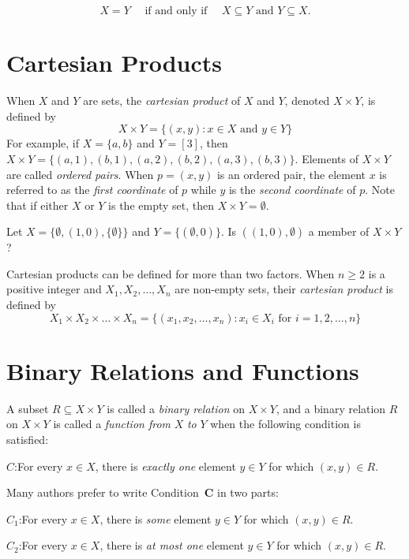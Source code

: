 \[
X = Y \quad\text{ if and only if }\quad X\subseteq Y \text{ and } Y\subseteq X.
\]  

\section{Cartesian Products} \label{s:background:products}

When $X$ and $Y$ are sets, the \textit{cartesian product}
of $X$ and $Y$, denoted $X\times Y$, is defined by
\[
X\times Y=\{(x,y): x\in X \text{ and } y\in Y\}
\]
For example, if $X=\{a,b\}$ and $Y=[3]$, then
$X\times Y=\{(a,1),(b,1),(a,2),(b,2),(a,3),(b,3)\}$.
Elements of $X\times Y$ are called \textit{ordered pairs}.
When $p=(x,y)$ is an ordered pair, the element $x$ is referred
to as the \textit{first coordinate} of $p$ while $y$ is the
\textit{second coordinate} of $p$.
Note that if either $X$ or $Y$ is the empty set, then
$X\times Y=\emptyset$.

\begin{example}
Let $X=\{\emptyset,(1,0),\{\emptyset\}\}$ and $Y=\{(\emptyset,0)\}$.
Is $((1,0),\emptyset)$ a member of $X\times Y$?
\end{example}

Cartesian products can be defined for more than two factors.
When $n\ge 2$ is a positive integer and $X_1,X_2,\dots,X_n$ are
non-empty sets, their \textit{cartesian product} is defined
by
\[
X_1\times X_2\times\dots\times X_n=\{(x_1,x_2,\dots,x_n): x_i\in X_i
\text{ for } i = 1,2,\dots,n\}
\]


\section{Binary Relations and Functions}\label{s:background:relations}

A subset $R\subseteq X\times Y$ is called a \textit{binary
relation} on $X\times Y$, and a binary relation $R$ on $X\times Y$ 
is called a \textit{function from} $X$ \textit{to} $Y$ when the
following condition is satisfied:

\medskip
\noindent
$C$:\quad For every $x\in X$, there is \textit{exactly one}
element $y\in Y$ for which $(x,y)\in R$.

\medskip
Many authors prefer to write Condition~\textbf{C} in two parts:

\medskip
\noindent
$C_1$:\quad For every $x\in X$, there is \textit{some}
element $y\in Y$ for which $(x,y)\in R$.

\medskip
\noindent
$C_2$:\quad For every $x\in X$, there is \textit{at most one}
element $y\in Y$ for which $(x,y)\in R$.

